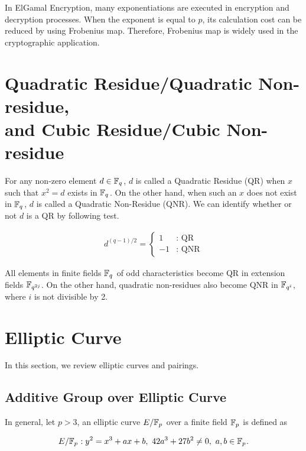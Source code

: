 In ElGamal Encryption, many exponentiations are executed in encryption and decryption processes.
When the exponent is equal to $p$, its calculation cost can be reduced by using Frobenius map.
Therefore, Frobenius map is widely used in the cryptographic application.     

\section{Quadratic Residue/Quadratic Non-residue, \\and Cubic Residue/Cubic Non-residue}
\label{sec:chap:fund:qrqnr}

For any non-zero element $d\in{\mathbb{F}}_{q^{}}$, $d$ is called a Quadratic Residue (QR) when $x$ such that $x^2=d$ exists in ${\mathbb{F}}_{q^{}}$.
On the other hand, when such an $x$ does not exist in ${\mathbb{F}}_{q^{}}$, $d$ is called a Quadratic Non-Residue (QNR).
We can identify whether or not $d$ is a QR by following test.

\begin{eqnarray}
d^{(q-1)/2} = \left\{
\begin{array}{ll}
1 & \mbox{: QR} \\
-1 & \mbox{: QNR} 
\end{array}
\right.
\end{eqnarray}

All elements in finite fields ${\mathbb{F}}_{q^{}}$ of odd characteristics become QR in extension fields ${\mathbb{F}}_{q^{2j}}$.
On the other hand, quadratic non-residues also become QNR in ${\mathbb{F}}_{q^{i}}$, where $i$ is not divisible by 2.


\section{Elliptic Curve}
\label{sec:chap:fund:ecc}
In this section, we review elliptic curves and pairings. 

\subsection{Additive Group over Elliptic Curve}

In general, let $p>3$, an elliptic curve $E/{\mathbb{F}}_{p^{}}$ over a finite field ${\mathbb{F}}_{p^{}}$ is defined as 

\begin{equation}
E/{\mathbb{F}}_{p^{}}: y^2=x^3+ax+b,\ 42a^3+27b^2 \neq 0,\ a,b\in {\mathbb{F}}_{p^{}}. \label{EC}
\end{equation}

